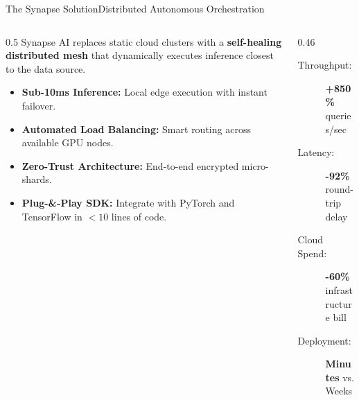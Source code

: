 \documentclass[aspectratio=169,10pt]{beamer}
\begin{document}
\begin{frame}{The Synapse Solution}{Distributed Autonomous Orchestration}
  \begin{columns}[c]
    \begin{column}{0.5\textwidth}
      \small
      Synapse AI replaces static cloud clusters with a \textbf{self-healing distributed mesh} that dynamically executes inference closest to the data source.
      
      \vspace*{0.25cm}
      \begin{itemize}
        \item \textbf{Sub-10ms Inference:} Local edge execution with instant failover.
        \item \textbf{Automated Load Balancing:} Smart routing across available GPU nodes.
        \item \textbf{Zero-Trust Architecture:} End-to-end encrypted micro-shards.
        \item \textbf{Plug-\&-Play SDK:} Integrate with PyTorch and TensorFlow in $< 10$ lines of code.
      \end{itemize}
    \end{column}
    
    \begin{column}{0.46\textwidth}
      \begin{tcolorbox}[emeraldcard, title={\small\faChartLine\ Quantified Value Deliverables}]
        \small
        \begin{description}
          \item[Throughput:] \textbf{+850\%} queries/sec
          \item[Latency:] \textbf{-92\%} round-trip delay
          \item[Cloud Spend:] \textbf{-60\%} infrastructure bill
          \item[Deployment:] \textbf{Minutes} vs. Weeks
        \end{description}
      \end{tcolorbox}
    \end{column}
  \end{columns}
\end{frame}
\end{document}
